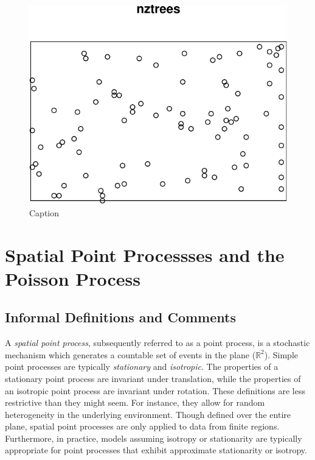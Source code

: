 \documentclass[12pt,twoside]{reedthesis}
\begin{document}
  \begin{figure}
  
  {\centering \includegraphics{Draft_files/figure-latex/fig1-1} 
  
  }
  
  \caption[Caption]{Caption}\label{fig:fig1}
  \end{figure}
  
  \chapter{Spatial Point Processses and the Poisson
  Process}\label{rmd-basics}
  
  \section{Informal Definitions and
  Comments}\label{informal-definitions-and-comments}
  
  A \emph{spatial point process}, subsequently referred to as a point
  process, is a stochastic mechanism which generates a countable set of
  events in the plane (\(\mathbb{R}^2\)). Simple point processes are
  typically \emph{stationary} and \emph{isotropic}. The properties of a
  stationary point process are invariant under translation, while the
  properties of an isotropic point process are invariant under rotation.
  These definitions are less restrictive than they might seem. For
  instance, they allow for random heterogeneity in the underlying
  environment. Though defined over the entire plane, spatial point
  processes are only applied to data from finite regions. Furthermore, in
  practice, models assuming isotropy or stationarity are typically
  appropriate for point processes that exhibit approximate stationarity or
  isotropy.
  
\end{document}
